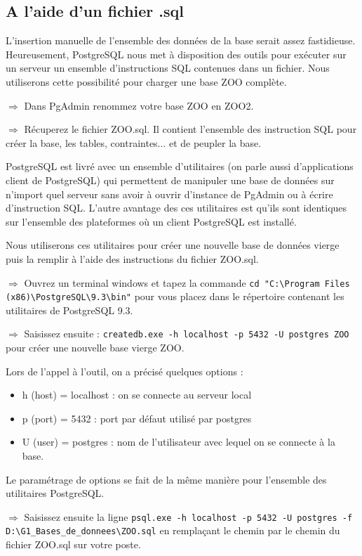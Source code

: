 \documentclass[11pt]{article}
\newcommand{\action}{$\Rightarrow$ }
\begin{document}
\subsection{A l'aide d'un fichier .sql}
L'insertion manuelle de l'ensemble des données de la base serait assez fastidieuse. Heureusement, PostgreSQL nous met à disposition des outils pour exécuter sur un serveur un ensemble d'instructions SQL contenues dans un fichier. Nous utiliserons cette possibilité pour charger une base ZOO complète.

\action Dans PgAdmin renommez votre base ZOO en ZOO2.

\action Récuperez le fichier ZOO.sql. Il contient l'ensemble des instruction SQL pour créer la base, les tables, contraintes... et de peupler la base.

PostgreSQL est livré avec un ensemble d'utilitaires (on parle aussi d'applications client de PostgreSQL) qui permettent de manipuler une base de données sur n'import quel serveur sans avoir à ouvrir d'instance de PgAdmin ou à écrire d'instruction SQL. L'autre avantage des ces utilitaires est qu'ils sont identiques sur l'ensemble des plateformes où un client PostgreSQL est installé.

Nous utiliserons ces utilitaires pour créer une nouvelle base de données vierge puis la remplir à l'aide des instructions du fichier ZOO.sql.

\action Ouvrez un terminal windows et tapez la commande \lstinline{cd "C:\Program Files (x86)\PostgreSQL\9.3\bin"} pour vous placez dans le répertoire contenant les utilitaires de PostgreSQL 9.3.

\action Saisissez ensuite : \lstinline{createdb.exe -h localhost -p 5432 -U postgres ZOO} pour créer une nouvelle base vierge ZOO.

Lors de l'appel à l'outil, on a précisé quelques options :
\begin{itemize}
	\item h (host) = localhost : on se connecte au serveur local
	\item p (port) = 5432 : port par défaut utilisé par postgres
	\item U (user) = postgres : nom de l'utilisateur avec lequel on se connecte à la base.
\end{itemize}

Le paramétrage de options se fait de la même manière pour l'ensemble des utilitaires PostgreSQL.

\action Saisissez ensuite la ligne \lstinline{psql.exe -h localhost -p 5432 -U postgres -f D:\G1_Bases_de_donnees\ZOO.sql} en remplaçant le chemin par le chemin du fichier ZOO.sql sur votre poste.
\end{document}
